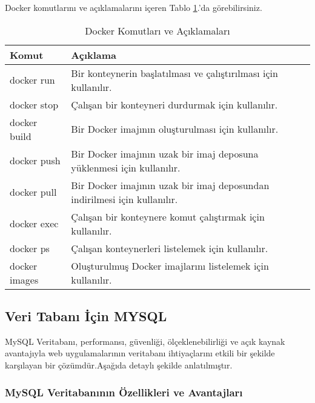 Docker komutlarını ve açıklamalarını içeren Tablo \ref{tab:docker-komutlar}.'da görebilirsiniz.
\begin{table}[h]
  \centering
  \caption{Docker Komutları ve Açıklamaları}
  \label{tab:docker-komutlar}
  \begin{tabular}{|p{}|p{}|}
  \hline
  \textbf{Komut} & \textbf{Açıklama} \\ \hline
  docker run & Bir konteynerin başlatılması ve çalıştırılması için kullanılır. \\ \hline
  docker stop & Çalışan bir konteyneri durdurmak için kullanılır. \\ \hline
  docker build & Bir Docker imajının oluşturulması için kullanılır. \\ \hline
  docker push & Bir Docker imajının uzak bir imaj deposuna yüklenmesi için kullanılır. \\ \hline
  docker pull & Bir Docker imajının uzak bir imaj deposundan indirilmesi için kullanılır. \\ \hline
  docker exec & Çalışan bir konteynere komut çalıştırmak için kullanılır. \\ \hline
  docker ps & Çalışan konteynerleri listelemek için kullanılır. \\ \hline
  docker images & Oluşturulmuş Docker imajlarını listelemek için kullanılır. \\ \hline
  \end{tabular}
\end{table}



\subsection{Veri Tabanı İçin \textbf{MYSQL }}
MySQL Veritabanı, performansı, güvenliği, ölçeklenebilirliği ve açık kaynak avantajıyla web uygulamalarının veritabanı ihtiyaçlarını etkili bir şekilde karşılayan bir çözümdür.Aşağıda detaylı şekilde anlatılmıştır.
\subsubsection{MySQL Veritabanının Özellikleri ve Avantajları}

